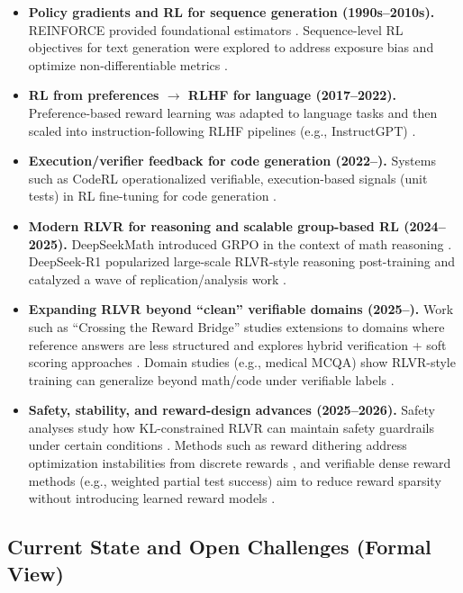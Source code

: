 \documentclass[unnumsec,webpdf,contemporary,large]{oup-authoring-template}
\theoremstyle{thmstyleone}
\theoremstyle{thmstyletwo}
\theoremstyle{thmstylethree}
\begin{document}
\begin{itemize}
  \item \textbf{Policy gradients and RL for sequence generation (1990s--2010s).}
  REINFORCE provided foundational estimators \cite{williams1992reinforce}.
  Sequence-level RL objectives for text generation were explored to address exposure bias and optimize non-differentiable metrics \cite{ranzato2016sequence,paulus2018summarization}.
  \item \textbf{RL from preferences $\rightarrow$ RLHF for language (2017--2022).}
  Preference-based reward learning \cite{christiano2017preferences} was adapted to language tasks \cite{ziegler2019finetuning,stiennon2020summarize} and then scaled into instruction-following RLHF pipelines (e.g., InstructGPT) \cite{ouyang2022instructgpt}.
  \item \textbf{Execution/verifier feedback for code generation (2022--).}
  Systems such as CodeRL operationalized verifiable, execution-based signals (unit tests) in RL fine-tuning for code generation \cite{le2022coderl}.
  \item \textbf{Modern RLVR for reasoning and scalable group-based RL (2024--2025).}
  DeepSeekMath introduced GRPO in the context of math reasoning \cite{deepseekai2024deepseekmath}.
  DeepSeek-R1 popularized large-scale RLVR-style reasoning post-training and catalyzed a wave of replication/analysis work \cite{guo2025deepseekr1,wen2025rlvr,mroueh2025grpo}.
  \item \textbf{Expanding RLVR beyond ``clean'' verifiable domains (2025--).}
  Work such as ``Crossing the Reward Bridge'' studies extensions to domains where reference answers are less structured and explores hybrid verification + soft scoring approaches \cite{su2025crossingrewardbridge}.
  Domain studies (e.g., medical MCQA) show RLVR-style training can generalize beyond math/code under verifiable labels \cite{zhang2025medrlvr}.
  \item \textbf{Safety, stability, and reward-design advances (2025--2026).}
  Safety analyses study how KL-constrained RLVR can maintain safety guardrails under certain conditions \cite{cho2025safetycapability}.
  Methods such as reward dithering address optimization instabilities from discrete rewards \cite{wei2025redit}, and verifiable dense reward methods (e.g., weighted partial test success) aim to reduce reward sparsity without introducing learned reward models \cite{wang2026verpo}.
\end{itemize}

\subsection{Current State and Open Challenges (Formal View)}
\end{document}
